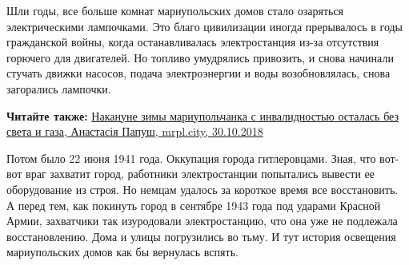 Шли годы, все больше комнат мариупольских домов стало озаряться электрическими
лампочками. Это благо цивилизации иногда прерывалось в годы гражданской войны,
когда останавливалась электростанция из-за отсутствия горючего для двигателей.
Но топливо умудрялись привозить, и снова начинали стучать движки насосов,
подача электроэнергии и воды возобновлялась, снова загорались лампочки.

\textbf{Читайте также:} \href{https://mrpl.city/news/view/nakanune-zimy-mariupolchanka-invalid-ostalas-bez-sveta-i-gaza}{%
Накануне зимы мариупольчанка с инвалидностью осталась без света и газа, Анастасія Папуш, mrpl.city, 30.10.2018}

Потом было 22 июня 1941 года. Оккупация города гитлеровцами. Зная, что вот-вот
враг захватит город, работники электростанции попытались вывести ее
оборудование из строя. Но немцам удалось за короткое время все восстановить. А
перед тем, как покинуть город в сентябре 1943 года под ударами Красной Армии,
захватчики так изуродовали электростанцию, что она уже не подлежала
восстановлению. Дома и улицы погрузились во тьму. И тут история освещения
мариупольских домов как бы вернулась вспять.
